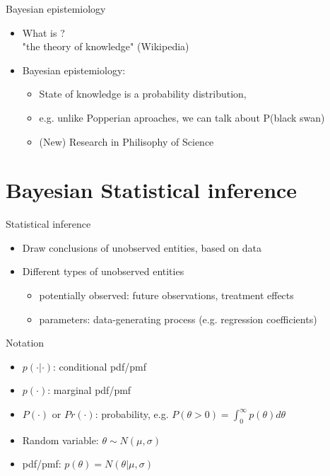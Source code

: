 \documentclass[10pt]{beamer}
\begin{document}
\begin{frame}{Bayesian epistemiology}

\pause



  \begin{itemize}
    \item What is ?
    \pause
    \\ "the theory of knowledge" (Wikipedia)
    \pause
    \item Bayesian epistemiology:
    \pause
    \begin{itemize}
    \item State of knowledge is a probability distribution,
    \item e.g. unlike Popperian aproaches, we can talk about P(black swan)
    \item (New) Research in Philisophy of Science
    \end{itemize}
  \end{itemize}
\end{frame}


\section{Bayesian Statistical inference}
\frame{\sectionpage}

\begin{frame}{Statistical inference}
  \begin{itemize}
  \item Draw conclusions of {\color{uured} unobserved} entities, based on {\color{uured} data} \pause
  \item Different types of unobserved entities
    \begin{itemize}
    \item {\color{uured} potentially observed}: future observations, treatment effects
    \item {\color{uured} parameters}: data-generating process (e.g. regression coefficients)
    \end{itemize}
  \end{itemize}
\end{frame}

\begin{frame}{Notation}

  \begin{itemize}
    \item $p(\cdot|\cdot)$: conditional pdf/pmf
    \item $p(\cdot)$: marginal pdf/pmf
    \item $P(\cdot)$ or $Pr(\cdot)$: probability, e.g. $P(\theta > 0) = \int_0^\infty p(\theta) d\theta$
    \item Random variable: $\theta \sim N(\mu,\sigma)$
    \item pdf/pmf: $p(\theta) = N(\theta | \mu,\sigma)$
  \end{itemize}

\end{frame}
\end{document}
